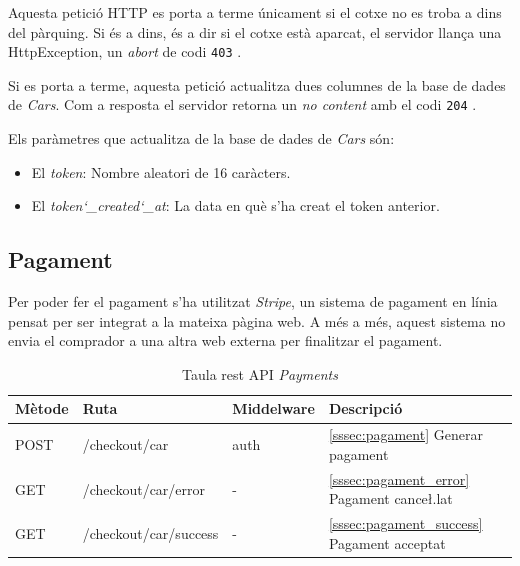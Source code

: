 Aquesta petició HTTP es porta a terme únicament si el cotxe no es troba a dins del
pàrquing. Si és a dins, és a dir si el cotxe està aparcat, el servidor
llança una HttpException, un \emph{abort} de codi \texttt{403} \autocite{http_403_response}.

Si es porta a terme, aquesta petició actualitza dues columnes de la base de dades
de \emph{Cars}. Com a resposta el servidor retorna un \emph{no content} amb el codi
\texttt{204} \autocite{http_204_response}.

Els paràmetres que actualitza de la base de dades de \emph{Cars} són:
\begin{itemize}
    \item El \emph{token}: Nombre aleatori de 16 caràcters.
    \item El \emph{token\char`_created\char`_at}: La data en què s'ha creat el token anterior.
\end{itemize}


\subsection{Pagament}

Per poder fer el pagament s'ha utilitzat \emph{Stripe}, un sistema de pagament en línia pensat per ser integrat
a la mateixa pàgina web. A més a més, aquest sistema no envia el comprador a una altra web externa per finalitzar
el pagament. \autocite{stripe}



\begin{table}[H]
\centering
\begin{tabular}{llll}
\hline
\textbf{Mètode} & \textbf{Ruta} & \textbf{Middelware} &\textbf{Descripció} \\ \hline
POST            & /checkout/{car}   & auth    &  \autoref{sssec:pagament}{ Generar pagament}     \\ \hline
GET             & /checkout/{car}/error  & - &  \autoref{sssec:pagament_error}{ Pagament cance\l.lat}     \\ \hline
GET             & /checkout/{car}/success & - &  \autoref{sssec:pagament_success}{ Pagament acceptat}     \\ \hline
\end{tabular}
\caption{Taula rest API \emph{Payments}}
\label{tab:my-payments-api-table}
\end{table}

